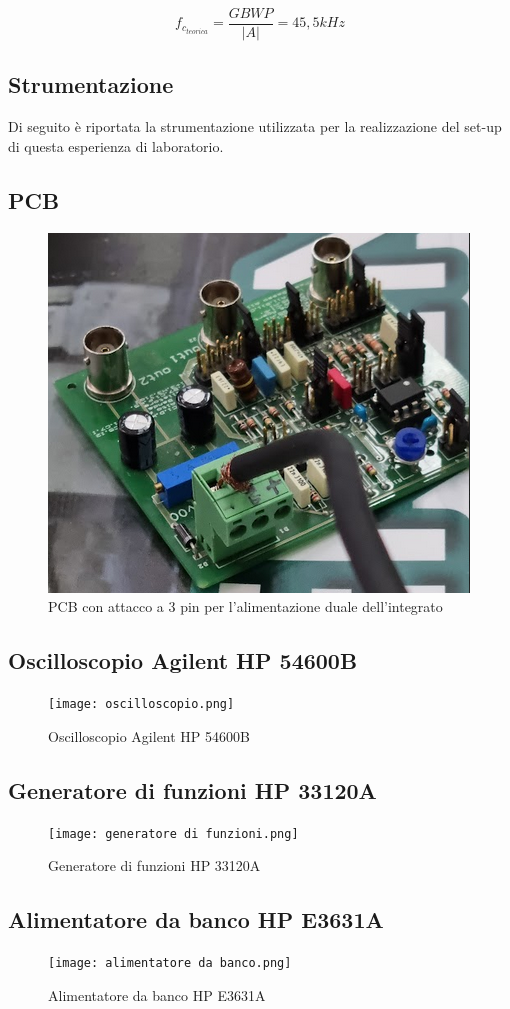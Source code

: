 \[f_{c_{teorica}}=\frac{GBWP}{|A|}=45,5kHz\]
\subsection{Strumentazione}
Di seguito è riportata la strumentazione utilizzata per la realizzazione del set-up di questa esperienza di laboratorio.

\subsection*{\textbf{PCB}}
\begin{figure}[h]
    \centering
    \includegraphics[width=0.5\linewidth]{media/PCB_attacco3pin.png}
    \caption{PCB con attacco a 3 pin per l'alimentazione duale dell'integrato}
    \label{fig:PCB_3pin}
\end{figure}
\FloatBarrier
\subsection*{\textbf{Oscilloscopio Agilent HP 54600B}}
\begin{figure}[h]
    \centering
    \texttt{[image: oscilloscopio.png]}
    \caption{Oscilloscopio Agilent HP 54600B}
    \label{fig:Agilent HP 54600B}
\end{figure}
\FloatBarrier
\subsection*{\textbf{Generatore di funzioni HP 33120A}}
\begin{figure}[h]
    \centering
    \texttt{[image: generatore di funzioni.png]}
    \caption{Generatore di funzioni HP 33120A}
    \label{fig:enter-label}
\end{figure}
\FloatBarrier
\subsection*{\textbf{Alimentatore da banco HP E3631A}}
\begin{figure}[h]
    \centering
    \texttt{[image: alimentatore da banco.png]}
    \caption{Alimentatore da banco HP E3631A}
    \label{fig:HPE3631A}
\end{figure}
\FloatBarrier
